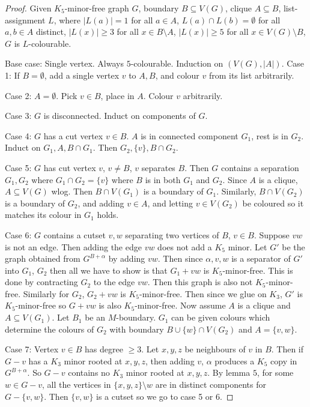 \documentclass[]{article}
\theoremstyle{definition}
\numberwithin{theorem}{section}
\numberwithin{equation}{section}
\begin{document}
\begin{proof}

	Given $K_5$-minor-free graph $G$, boundary $B \subseteq V(G)$, clique $A \subseteq B$, list-assignment $L$, where $|L(a)| = 1$ for all $a \in A$, $L(a) \cap L(b) = \emptyset$ for all $a, b \in A$ distinct, $|L(x)| \geq 3$ for all $x \in B \setminus A$, $|L(x)| \geq 5$ for all $x \in V(G) \setminus B$, $G$ is $L$-colourable.

	Base case: Single vertex. Always $5$-colourable.
	Induction on $(V(G), |A|)$.
	Case 1: If $B = \emptyset$, add a single vertex $v$ to $A, B$, and colour $v$ from its list arbitrarily. 

	Case 2: $A = \emptyset$. Pick $v \in B$, place in $A$. Colour $v$ arbitrarily. 

	Case 3: $G$ is disconnected. Induct on components of $G$. 

	Case 4: $G$ has a cut vertex $v \in B$. $A$ is in connected component $G_1$, rest is in $G_2$. Induct on $G_1, A, B \cap G_1$. Then $G_2, \{v\}, B \cap G_2$. 
	
	Case 5: $G$ has cut vertex $v$, $v \neq B$, $v$ separates $B$. Then $G$ contains a separation $G_1, G_2$ where $G_1 \cap G_2 = \{v\}$ where $B$ is in both $G_1$ and $G_2$. Since $A$ is a clique, $A \subseteq V(G)$ wlog. Then $B \cap V(G_1)$ is a boundary of $G_1$. Similarly, $B \cap V(G_2)$ is a boundary of $G_2$, and adding $v \in A$, and letting $v \in V(G_2)$ be coloured so it matches its colour in $G_1$ holds. 

	Case 6: $G$ contains a cutset $v, w$ separating two vertices of $B$, $v \in B$. Suppose $vw$ is not an edge. Then adding the edge $vw$ does not add a $K_5$ minor. Let $G'$ be the graph obtained from $G^{B + \alpha}$ by adding $vw$. Then since $\alpha, v, w$ is a separator of $G'$ into $G_1$, $G_2$ then all we have to show is that $G_1 + vw$ is $K_5$-minor-free. This is done by contracting $G_2$ to the edge $vw$. Then this graph is also not $K_5$-minor-free. Similarly for $G_2$, $G_2 + vw$ is $K_5$-minor-free. Then since we glue on $K_3$, $G'$ is $K_5$-minor-free so $G + vw$ is also $K_5$-minor-free. Now assume $A$ is a clique and $A \subseteq V(G_1)$. Let $B_1$ be an $M$-boundary. $G_1$ can be given colours which determine the colours of $G_2$ with boundary $B \cup \{w\} \cap V(G_2)$ and $A = \{v,w\}$. 

	Case 7: Vertex $v \in B$ has degree $\geq 3$. Let $x,y,z$ be neighbours of $v$ in $B$. Then if $G - v$ has a $K_3$ minor rooted at $x, y, z$, then adding $v$, $\alpha$ produces a $K_5$ copy in $G^{B + \alpha}$. So $G - v$ contains no $K_3$ minor rooted at $x, y, z$. By lemma $5$, for some $w \in G - v$, all the vertices in $\{x, y, z\} \setminus w$ are in distinct components for $G - \{v, w\}$. Then $\{v, w\}$ is a cutset so we go to case 5 or 6.


\end{proof}
\end{document}
